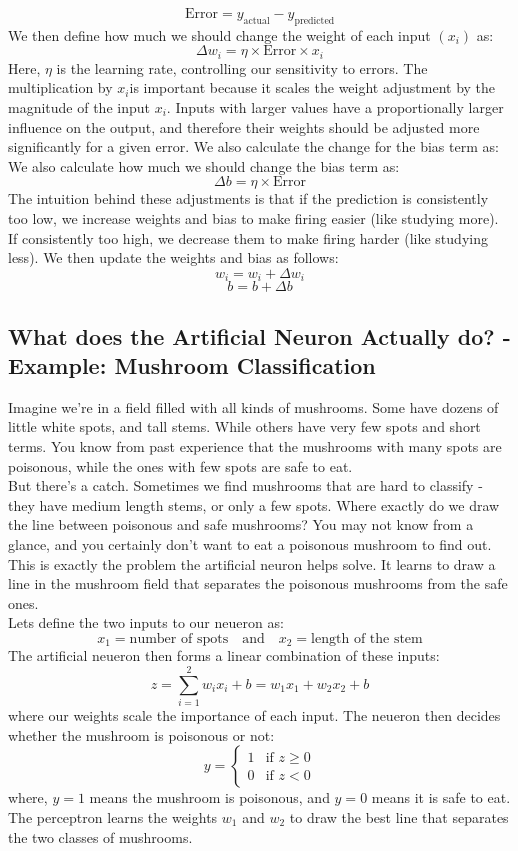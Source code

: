 \documentclass[9pt]{extarticle}
\theoremstyle{plain}
\theoremstyle{definition}
\theoremstyle{remark}
\begin{document}
$$\text{Error} = y_{\text{actual}} - y_{\text{predicted}}$$
We then define how much we should change the weight of each input $(x_i)$ as:
$$\Delta w_i = \eta \times \text{Error} \times x_i$$
Here, $\eta$ is the learning rate, controlling our sensitivity to errors.
The multiplication by $x_i$is important because it scales the weight adjustment by the magnitude of the input $x_i$.
Inputs with larger values have a proportionally larger influence on the output,
and therefore their weights should be adjusted more significantly for a given error.
We also calculate the change for the bias term as:
We also calculate how much we should change the bias term as:
$$\Delta b = \eta \times \text{Error}$$
The intuition behind these adjustments is that if the prediction is consistently too low, we increase weights and bias to make firing easier (like studying more).
If consistently too high, we decrease them to make firing harder (like studying less). We then update the weights and bias as follows:
$$w_i = w_i + \Delta w_i$$
$$b = b + \Delta b$$


\pagebreak

\subsection{What does the Artificial Neuron Actually do? - Example: Mushroom Classification}
Imagine we're in a field filled with all kinds of mushrooms. Some have dozens of little white spots, and tall stems. While others have very few spots and short terms.
You know from past experience that the mushrooms with many spots are poisonous, while the ones with few spots are safe to eat. \\[2ex]
But there's a catch. Sometimes we find mushrooms that are hard to classify - they have medium length stems, or only a few spots. Where exactly do we draw the line between poisonous and safe mushrooms? You may not know from a glance, and you
certainly don't want to eat a poisonous mushroom to find out. \\[2ex]
This is exactly the problem the artificial neuron helps solve. It learns to draw a line in the mushroom field that separates the poisonous mushrooms from the safe ones.\\
Lets define the two inputs to our neueron as:
$$x_1 = \text{number of spots} \quad \text{and} \quad x_2 = \text{length of the stem}$$
The artificial neueron then forms a linear combination of these inputs:
$$z = \sum_{i=1}^{2} w_i x_i + b = w_1 x_1 + w_2 x_2 + b$$
where our weights scale the importance of each input.
The neueron then decides whether the mushroom is poisonous or not:
$$
    y = \begin{cases}
        1 & \text{if } z \geq 0 \\
        0 & \text{if } z < 0
    \end{cases}
$$
where, $y = 1$ means the mushroom is poisonous, and $y = 0$ means it is safe to eat. The perceptron learns the weights $w_1$ and $w_2$ to draw the best line that separates the two classes of mushrooms.
\end{document}
